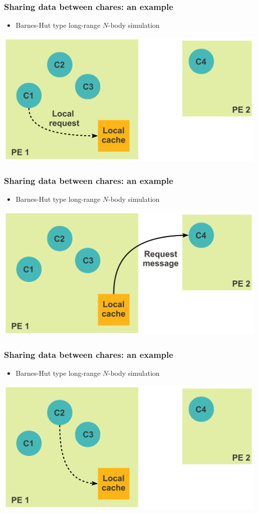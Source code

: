 \begin{frame}[fragile]
  \frametitle{Sharing data between chares: an example}
  \begin{itemize}
    \item Barnes-Hut type long-range $N$-body simulation
  \end{itemize}
  \includegraphics[width=\textwidth]{figures/advancedOpts/fig4}
\end{frame}

\begin{frame}[fragile]
  \frametitle{Sharing data between chares: an example}
  \begin{itemize}
    \item Barnes-Hut type long-range $N$-body simulation
  \end{itemize}
  \includegraphics[width=\textwidth]{figures/advancedOpts/fig5}
\end{frame}

\begin{frame}[fragile]
  \frametitle{Sharing data between chares: an example}
  \begin{itemize}
    \item Barnes-Hut type long-range $N$-body simulation
  \end{itemize}
  \includegraphics[width=\textwidth]{figures/advancedOpts/fig6}
\end{frame}


